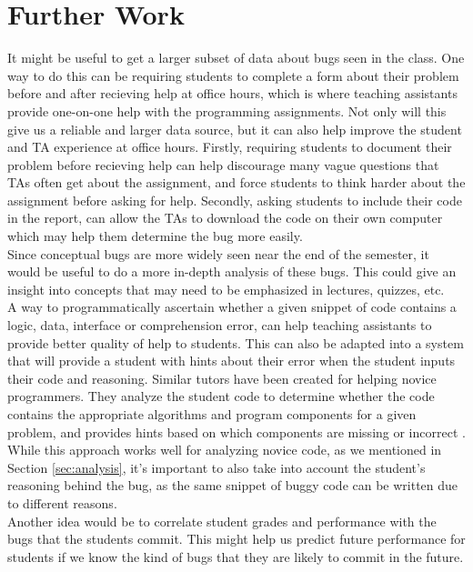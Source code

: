 \documentclass[11pt,letterpaper]{article}
\begin{document}
\section{Further Work}
It might be useful to get a larger subset of data about bugs seen in the class. One way to do this can be requiring students to complete a form about their problem before and after recieving help at office hours, which is where teaching assistants provide one-on-one help with the programming assignments. Not only will this give us a reliable and larger data source, but it can also help improve the student and TA experience at office hours. Firstly, requiring students to document their problem before recieving help can help discourage many vague questions that TAs often get about the assignment, and force students to think harder about the assignment before asking for help. Secondly, asking students to include their code in the report, can allow the TAs to download the code on their own computer which may help them determine the bug more easily.\\

Since conceptual bugs are more widely seen near the end of the semester, it would be useful to do a more in-depth analysis of these bugs. This could give an insight into concepts that may need to be emphasized in lectures, quizzes, etc.\\

A way to programmatically ascertain whether a given snippet of code contains a logic, data, interface or comprehension error, can help teaching assistants to provide better quality of help to students. This can also be adapted into a system that will provide a student with hints about their error when the student inputs their code and reasoning. Similar tutors have been created for helping novice programmers. They analyze the student code to determine whether the code contains the appropriate algorithms and program components for a given problem, and provides hints based on which components are missing or incorrect \cite{Sudol-DeLyser14}. While this approach works well for analyzing novice code, as we mentioned in Section \ref{sec:analysis}, it's important to also take into account the student's reasoning behind the bug, as the same snippet of buggy code can be written due to different reasons.\\

Another idea would be to correlate student grades and performance with the bugs that the students commit. This might help us predict future performance for students if we know the kind of bugs that they are likely to commit in the future.\\
\end{document}
